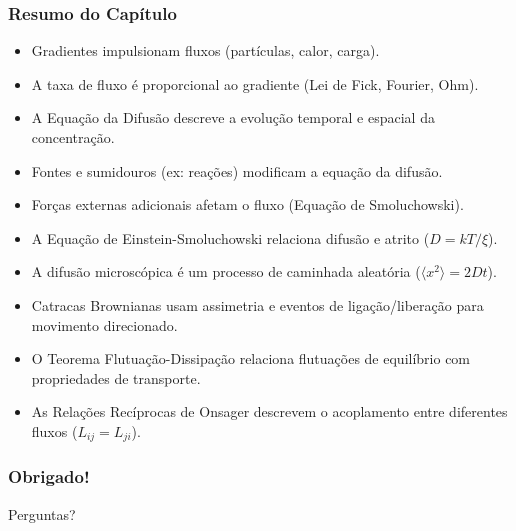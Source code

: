 \documentclass[11pt]{beamer}
\begin{document}
\begin{frame}
    \frametitle{Resumo do Capítulo}
    \begin{itemize}
        \item Gradientes impulsionam fluxos (partículas, calor, carga).
        \item A taxa de fluxo é proporcional ao gradiente (Lei de Fick, Fourier, Ohm).
        \item A Equação da Difusão descreve a evolução temporal e espacial da concentração.
        \item Fontes e sumidouros (ex: reações) modificam a equação da difusão.
        \item Forças externas adicionais afetam o fluxo (Equação de Smoluchowski).
        \item A Equação de Einstein-Smoluchowski relaciona difusão e atrito ($D=kT/\xi$).
        \item A difusão microscópica é um processo de caminhada aleatória ($\langle x^2 \rangle = 2Dt$).
        \item Catracas Brownianas usam assimetria e eventos de ligação/liberação para movimento direcionado.
        \item O Teorema Flutuação-Dissipação relaciona flutuações de equilíbrio com propriedades de transporte.
        \item As Relações Recíprocas de Onsager descrevem o acoplamento entre diferentes fluxos ($L_{ij}=L_{ji}$).
    \end{itemize}
\end{frame}

\begin{frame}
    \frametitle{Obrigado!}
    \begin{center}
        Perguntas?
    \end{center}
\end{frame}
\end{document}
